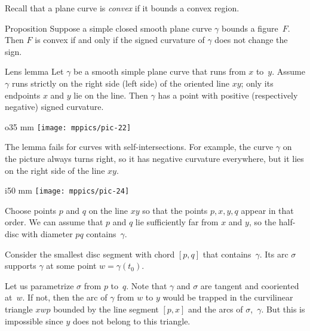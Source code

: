 Recall that a plane curve is \emph{convex} if it bounds a convex region.

\begin{thm}{Proposition}\label{prop:convex}
Suppose a simple closed smooth plane curve $\gamma$ bounds a figure~$F$.
Then $F$ is convex if and only if the signed curvature of $\gamma$ does not change the sign.
\end{thm}


\begin{thm}{Lens lemma}\label{lem:lens}
Let $\gamma$ be a smooth simple plane curve that runs from $x$ to~$y$.
Assume $\gamma$ runs strictly on the right side (left side) of the oriented line $xy$; only its endpoints $x$ and $y$ lie on the line.
Then $\gamma$ has a point with positive (respectively negative) signed curvature.
\end{thm}

{

\begin{wrapfigure}{o}{35 mm}
\vskip-4mm
\centering
\texttt{[image: mppics/pic-22]}
\vskip0mm
\end{wrapfigure}

The lemma fails for curves with self-intersections.
For example, the curve $\gamma$ on the picture always turns right, 
so it has negative curvature everywhere, but it lies on the right side of the line $xy$.

}

\begin{wrapfigure}[6]{i}{50 mm}
\vskip-3mm
\centering
\texttt{[image: mppics/pic-24]}
\end{wrapfigure}

Choose points $p$ and $q$ on the line $xy$
so that the points $p, x, y, q$ appear in that order.
We can assume that $p$ and $q$ lie sufficiently far from $x$ and $y$, so the half-disc with diameter $pq$ contains~$\gamma$.

Consider the smallest disc segment with chord $[p,q]$ that contains~$\gamma$.
Its arc $\sigma$ supports $\gamma$ at some point $w=\gamma(t_0)$.

Let us parametrize $\sigma$ from $p$ to~$q$.
Note that $\gamma$ and $\sigma$ are tangent and cooriented at~$w$.
If not, then the arc of $\gamma$ from $w$ to $y$ would be trapped in the curvilinear triangle $xwp$ bounded by the line segment $[p,x]$ and the arcs of $\sigma$,~$\gamma$.
But this is impossible since $y$ does not belong to this triangle.

